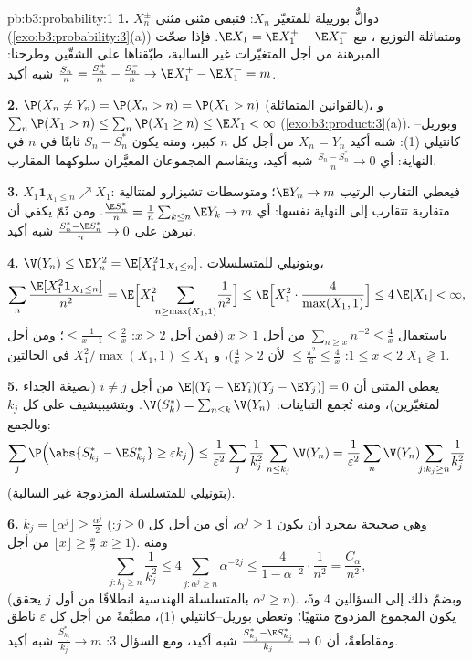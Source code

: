 \begin{solution}{pb:b3:probability:1}
\textbf{1.} $X_n^{\pm}$ دوالٌّ بورييلة للمتغيّر $X_n$: فتبقى
 مثنى مثنى (\cref{exo:b3:probability:3}(a)) ومتماثلة التوزيع ، مع $\E X_1 = \E X_1^+ - \E
X_1^-$. فإذا صحّت المبرهنة من أجل المتغيّرات غير
السالبة، طبّقناها على الشقّين وطرحنا: $\frac{S_n}n = \frac{S_n^+}n - \frac{S_n^-}n \to \E X_1^+ -
\E X_1^- = m$ شبه أكيد.

\textbf{2.} $\P(X_n \neq Y_n) = \P(X_n > n) = \P(X_1 > n)$ (بالقوانين المتماثلة)، و $\sum_n\P(X_1 > n) \leq \sum_n\P(X_1
\geq n) \leq \E X_1 < \infty$
(\cref{exo:b3:product:3}(a)). وبوريل--كانتيلي (1): شبه أكيد $X_n = Y_n$ من
أجل كل $n$ كبير، ومنه يكون $S_n - S_n^*$ ثابتًا في $n$ في
النهاية: أي $\frac{S_n - S_n^*}n \to 0$ شبه أكيد، ويتقاسم المجموعان المعيَّران
سلوكهما المقارب.

\textbf{3.} $X_1\mathbf 1_{X_1 \leq n} \nearrow X_1$: فيعطي التقارب الرتيب $\E Y_n \to m$؛
ومتوسطات تشيزارو لمتتالية متقاربة تتقارب إلى النهاية نفسها:
أي $\frac{\E S_n^*}n =
\frac1n\sum_{k\leq n}\E Y_k \to m$. ومن ثَمّ يكفي أن نبرهن على $\frac{S^*_n - \E S^*_n}{n} \to 0$ شبه أكيد.

\textbf{4.} $\V(Y_n) \leq \E Y_n^2 = \E[X_1^2\mathbf
1_{X_1\leq n}]$. وبتونيلي للمتسلسلات،
\[
\sum_n\frac{\E[X_1^2\mathbf 1_{X_1\leq n}]}{n^2}
= \E\Bigl[X_1^2\!\!\sum_{n \geq \max(X_1, 1)}\!\frac1{n^2}
\Bigr]
\leq \E\Bigl[X_1^2\cdot\frac{4}{\max(X_1,1)}\Bigr]
\leq 4\,\E[X_1] < \infty,
\]
باستعمال $\sum_{n\geq x}n^{-2} \leq \frac4x$ من أجل $x \geq 1$ (فمن أجل $x \geq 2$:
$\leq \frac1{x-1} \leq \frac2x$؛ ومن أجل $1
\leq x < 2$: $\leq \frac{\pi^2}6 \leq \frac4x$ لأن $\frac4x > 2$)، و $X_1^2/\max(X_1, 1) \leq X_1$
في الحالتين $X_1 \gtrless 1$.

\textbf{5.} يعطي  المثنى أن $\E[(Y_i - \E
Y_i)(Y_j - \E Y_j)] = 0$ من أجل $i \neq j$
(بصيغة الجداء لمتغيّرين)، ومنه تُجمع التباينات: $\V(S^*_k) =
\sum_{n\leq k}\V(Y_n)$.
وبتشيبيشيف على كل $k_j$ وبالجمع:
\[
\sum_j\P\Bigl(\abs{S^*_{k_j} - \E S^*_{k_j}} \geq
\varepsilon k_j\Bigr)
\leq \frac1{\varepsilon^2}\sum_j\frac1{k_j^2}\sum_{n\leq
k_j}\V(Y_n)
= \frac1{\varepsilon^2}\sum_n\V(Y_n)\!\!\sum_{j : k_j\geq
n}\!\frac1{k_j^2}
\]
(بتونيلي للمتسلسلة المزدوجة غير السالبة).

\textbf{6.} $k_j = \lfloor\alpha^j\rfloor \geq
\frac{\alpha^j}2$ (وهي صحيحة بمجرد أن يكون $\alpha^j \geq 1$، أي من أجل
كل $j \geq 0$: $\lfloor x\rfloor \geq \frac x2$ من أجل $x \geq
1$). ومنه
\[
\sum_{j : k_j \geq n}\frac1{k_j^2}
\leq 4\sum_{j : \alpha^j \geq n}\alpha^{-2j}
\leq \frac{4}{1 - \alpha^{-2}}\cdot\frac1{n^2}
= \frac{C_\alpha}{n^2},
\]
(بالمتسلسلة الهندسية انطلاقًا من أول $j$ يحقق $\alpha^j \geq
n$). وبضمّ
ذلك إلى السؤالين 4 و5، يكون المجموع المزدوج منتهيًا؛ وتعطي
بوريل--كانتيلي (1)، مطبَّقةً من أجل كل $\varepsilon$ ناطق
ومقاطَعةً، أن $\frac{S^*_{k_j} - \E S^*_{k_j}}{k_j} \to 0$ شبه أكيد، ومع السؤال 3: $\frac{S^*_{k_j}}{k_j} \to m$ شبه أكيد.


\end{solution}
